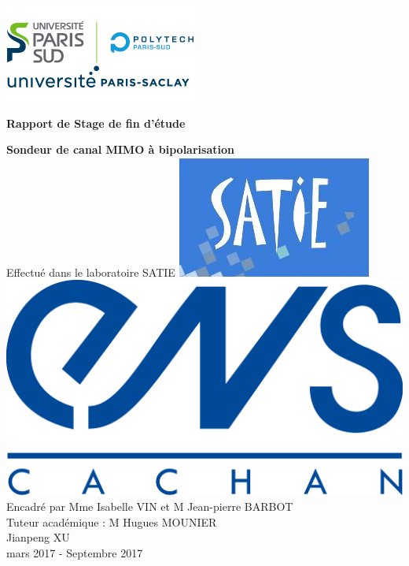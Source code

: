 \documentclass[a4paper, 12pt]{report}
\author{Jianpeng XU}
\newcommand{\alal}
{\linebreak
\linebreak
\linebreak
\linebreak}
\begin{document}
\makeatletter
\let\ps@plain\ps@fancy
\makeatother
\begin{center}
\LARGE







\begin{flushright}
\includegraphics[scale=0.85]{psud.jpg} 
\end{flushright}

\huge
\textbf{Rapport de Stage de fin d'étude } 
\linebreak
\normalsize
\alal
\huge

\textbf{Sondeur de canal MIMO à bipolarisation}
\\Effectué dans le laboratoire SATIE
\linebreak
\linebreak
\includegraphics[scale=0.8]{SATIE.jpg}
\includegraphics[scale=0.35]{logo_ensc_bleu.png} 
\alal
\vfill
\large
Encadré par Mme Isabelle VIN et M Jean-pierre BARBOT\\
Tuteur académique : M Hugues MOUNIER\\
Jianpeng XU\\
mars 2017 - Septembre 2017
\alal

\end{center}
\newpage
\setcounter{tocdepth}{3}
\tableofcontents
\newpage
\listoffigures
\newpage
\end{document}
